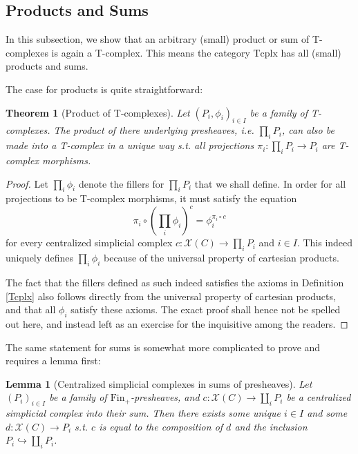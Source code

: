 \documentclass{article}
\newtheorem{theorem}{Theorem}[subsection]
\newtheorem{lemma}{Lemma}[subsection]
\theoremstyle{remark}
\theoremstyle{definition}
\newcommand{\Fin}{\mathrm{Fin}}
\newcommand{\X}{\mathcal X}
\newcommand{\Tcplx}{\mathrm{Tcplx}}
\begin{document}
	\subsection{Products and Sums}
	In this subsection, we show that an arbitrary (small) product or sum of T-complexes is again a T-complex. This means the category $\Tcplx$ has all (small) products and sums.
	
	The case for products is quite straightforward:
	\begin{theorem}[Product of T-complexes]
		Let $(P_i,\phi_i)_{i\in I}$ be a family of T-complexes. The product of there underlying presheaves, i.e. $\prod_iP_i$, can also be made into a T-complex in a unique way s.t. all projections $\pi_i:\prod_iP_i\to P_i$ are T-complex morphisms.
	\end{theorem}
	\begin{proof}
		Let $\prod_i\phi_i$ denote the fillers for $\prod_iP_i$ that we shall define. In order for all projections to be T-complex morphisms, it must satisfy the equation
		\begin{equation}\label{prodfill}
			\pi_i\circ\left(\prod_i\phi_i\right)^c=\phi_i^{\pi_i\circ c}
		\end{equation}
		for every centralized simplicial complex $c:\X(C)\to\prod_iP_i$ and $i\in I$. This indeed uniquely defines $\prod_i\phi_i$ because of the universal property of cartesian products.
		
		The fact that the fillers defined as such indeed satisfies the axioms in Definition \ref{Tcplx} also follows directly from the universal property of cartesian products, and that all $\phi_i$ satisfy these axioms. The exact proof shall hence not be spelled out here, and instead left as an exercise for the inquisitive among the readers.
	\end{proof}
	The same statement for sums is somewhat more complicated to prove and requires a lemma first:
	\begin{lemma}[Centralized simplicial complexes in sums of presheaves]\label{cscsum}
		Let $(P_i)_{i\in I}$ be a family of $\Fin_+$-presheaves, and $c:\X(C)\to\coprod_iP_i$ be a centralized simplicial complex into their sum. Then there exists some unique $i\in I$ and some $d:\X(C)\to P_i$ s.t. $c$ is equal to the composition of $d$ and the inclusion $P_i\hookrightarrow\coprod_iP_i$.
	\end{lemma}
\end{document}
